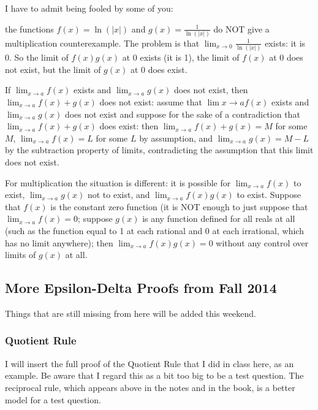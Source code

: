 \documentclass[12pt]{article}
\begin{document}
\begin{description}
I have to admit being fooled by some of you:

the functions $f(x) = \ln(|x|)$ and $g(x) = \frac1{\ln(|x|)}$ do NOT give a multiplication counterexample.  The problem is that $\lim_{x \rightarrow 0}\frac1{\ln(|x|)}$ exists:   it is 0.
So the limit of $f(x)g(x)$ at 0 exists (it is 1), the limit of $f(x)$ at 0 does not exist, but the limit of $g(x)$ at 0 does exist.

If $\lim_{x \rightarrow a}f(x)$ exists and $\lim_{x \rightarrow a}g(x)$ does not exist, then $\lim_{x \rightarrow a}f(x)+g(x)$ does not exist: assume that $\lim{x \rightarrow a}f(x)$ exists and $\lim_{x \rightarrow a}g(x)$ does not exist and suppose for the sake of a contradiction
that $\lim_{x \rightarrow a}f(x)+g(x)$ does exist:  then $\lim_{x \rightarrow a}f(x)+g(x)=M$  for some $M$,   $\lim_{x \rightarrow a}f(x)=L$ for some $L$ by assumption, and $\lim_{x \rightarrow a}g(x)=M-L$ by the subtraction property of limits, contradicting the assumption that this limit does not exist.

For multiplication the situation is different:  it is possible for $\lim_{x \rightarrow a}f(x)$ to exist, $\lim_{x \rightarrow a} g(x)$ not to exist, and $\lim_{x \rightarrow a}f(x)g(x)$ to exist.  Suppose that $f(x)$ is the constant zero function
(it is NOT enough to just suppose that $\lim_{x \rightarrow a}f(x)=0$; suppose $g(x)$ is any function defined for all reals at all (such as the function equal to 1 at each rational and 0 at each irrational, which has no limit anywhere);
then $\lim_{x \rightarrow a}f(x)g(x)=0$ without any control over limits of $g(x)$ at all.


\end{description}

\subsection{More Epsilon-Delta Proofs from Fall 2014}

Things that are still missing from here will be added this weekend.

\subsubsection{Quotient Rule}

I will insert the full proof of the Quotient Rule that I did in class here, as an example.   Be aware that I regard this as a bit too big to be a test question.   The reciprocal rule, which appears above in the notes and in the book, is a better model for a test question.
\end{document}
